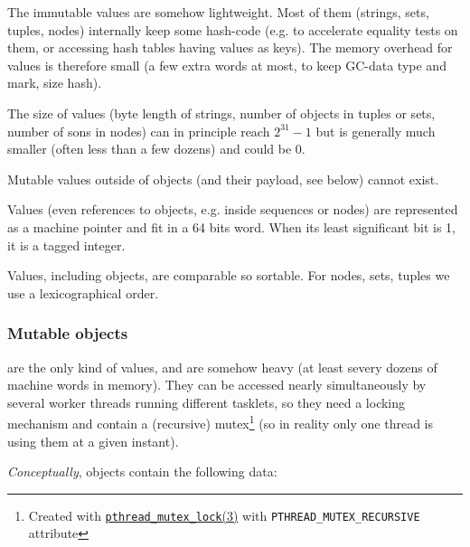 The immutable values are somehow lightweight. Most of them (strings,
sets, tuples, nodes) internally keep some hash-code (e.g. to
accelerate equality tests on them, or accessing hash tables having
values as keys). The memory overhead for values is therefore small (a
few extra words at most, to keep GC-data type and mark, size hash).

The size of values (byte length of strings, number of objects in
tuples or sets, number of sons in nodes) can in principle reach
$2^{31} - 1$ but is generally much smaller (often less than a few
dozens) and could be 0.

Mutable values outside of objects (and their payload, see below)
cannot exist.

Values (even references to objects, e.g. inside sequences or nodes)
are represented as a machine pointer and fit in a 64 bits word. When
its least significant bit is 1, it is a tagged integer.

Values, including objects, are comparable so sortable. For nodes,
sets, tuples we use a lexicographical order.

\subsubsection{Mutable objects}

 are the only kind of 
values, and are somehow heavy (at least severy dozens of machine words
in memory). They can be accessed nearly simultaneously by several
worker threads running different tasklets, so they need a locking
mechanism and contain a (recursive) mutex\footnote{Created with
  \href{http://man7.org/linux/man-pages/man3/pthread\_mutex\_lock.3p.html}{\texttt{pthread\_mutex\_lock}(3)}
  with \texttt{PTHREAD\_MUTEX\_RECURSIVE} attribute} (so in reality
only one thread is using them at a given instant).

\medskip

\emph{Conceptually}, objects contain the following data:

